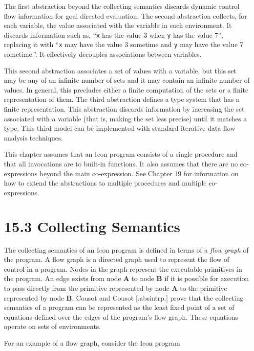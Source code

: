 The first abstraction beyond the collecting semantics discards dynamic
control flow information for goal directed evaluation. The second
abstraction collects, for each variable, the value associated with the
variable in each environment. It discards information such as,
``\texttt{x} has the value 3 when \texttt{y} has the value 7'',
replacing it with ``\texttt{x} may have the value 3 sometime
and \texttt{y} may have the value 7 sometime.''. It effectively
decouples associations between variables.

This second abstraction associates a set of values with a variable,
but this set may be any of an infinite number of sets and it may
contain an infinite number of values. In general, this precludes
either a finite computation of the sets or a finite representation of
them. The third abstraction defines a type system that has a finite
representation.  This abstraction discards information by increasing
the set associated with a variable (that is, making the set less
precise) until it matches a type. This third model can be implemented
with standard iterative data flow analysis techniques.

This chapter assumes that an Icon program consists of a single
procedure and that all invocations are to built-in functions. It also
assumes that there are no co-expressions beyond the main
co-expression. See Chapter 19 for information on how to extend the
abstractions to multiple procedures and multiple co-expressions.


\section[15.3 Collecting Semantics]{15.3 Collecting Semantics}

The collecting semantics of an Icon program is defined in terms of a
\textit{flow graph} of the program. A flow graph is a directed graph
used to represent the flow of control in a program. Nodes in the graph
represent the executable primitives in the program. An edge exists
from node \textbf{A} to node \textbf{B} if it is possible for
execution to pass directly from the primitive represented by node
\textbf{A} to the primitive represented by node \textbf{B}. Cousot and
Cousot [.absintrp.] prove that the collecting semantics of a program
can be represented as the least fixed point of a set of equations
defined over the edges of the program's flow graph. These equations
operate on sets of environments.

For an example of a flow graph, consider the Icon program 

